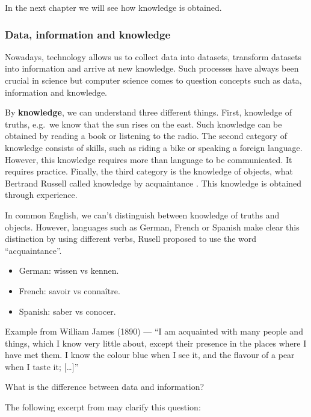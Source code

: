 \documentclass[
]{book}
\providecommand{\tightlist}{%
  \setlength{\itemsep}{0pt}\setlength{\parskip}{0pt}}
\begin{document}
In the next chapter we will see how knowledge is obtained.

\hypertarget{data-information-and-knowledge}{%
\subsubsection{Data, information and knowledge}\label{data-information-and-knowledge}}

Nowadays, technology allows us to collect data into datasets, transform datasets into information and arrive at new knowledge. Such processes have always been crucial in science but computer science comes to question concepts such as data, information and knowledge. \citep{johansson2016philosophy}

By \textbf{knowledge}, we can understand three different things. First, knowledge of truths, e.g.~we know that the sun rises on the east. Such knowledge can be obtained by reading a book or listening to the radio.
The second category of knowledge consists of skills, such as riding a bike or speaking a foreign language. However, this knowledge requires more than language to be communicated. It requires practice.
Finally, the third category is the knowledge of objects, what Bertrand Russell called knowledge by acquaintance \citep{russell2001problems}. This knowledge is obtained through experience.

In common English, we can't distinguish between knowledge of truths and objects. However, languages such as German, French or Spanish make clear this distinction by using different verbs, Rusell proposed to use the word ``acquaintance''.

\begin{itemize}
\tightlist
\item
  German: wissen vs kennen.
\item
  French: savoir vs connaître.
\item
  Spanish: saber vs conocer.
\end{itemize}

Example from William James (1890) --- ``I am acquainted with many people and things, which I know very little about, except their presence in the places where I have met them. I know the colour blue when I see it, and the flavour of a pear when I taste it; {[}\ldots{]}''

What is the difference between data and information?

The following excerpt from \citep{johansson2016philosophy} may clarify this question:
\end{document}

